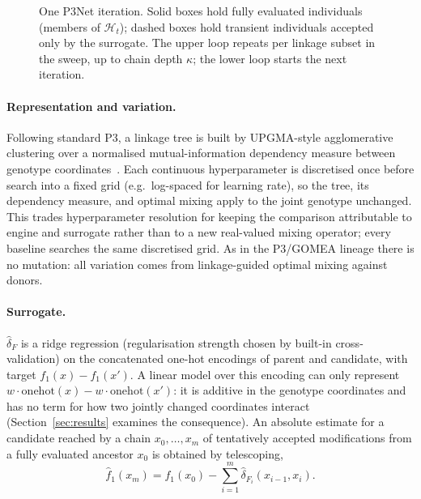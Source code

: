 \begin{figure}[t]
{%
    }
    \caption{One P3Net iteration. Solid boxes hold fully evaluated individuals (members of $\mathcal{H}_t$);
    dashed boxes hold transient individuals accepted only by the surrogate. The upper loop repeats per linkage
    subset in the sweep, up to chain depth $\kappa$; the lower loop starts the next iteration.}
    \label{fig:p3net-loop}
\end{figure}

\paragraph{Representation and variation.} Following standard P3, a linkage tree is built by UPGMA-style
agglomerative clustering over a normalised mutual-information dependency measure between genotype
coordinates~\citep{goldman2014parameterless}. Each continuous hyperparameter is discretised once before search
into a fixed grid (e.g.\ log-spaced for learning rate), so the tree, its dependency measure, and optimal mixing
apply to the joint genotype unchanged. This trades hyperparameter resolution for keeping the comparison
attributable to engine and surrogate rather than to a new real-valued mixing operator; every baseline searches
the same discretised grid. As in the P3/GOMEA lineage there is no mutation: all variation comes from
linkage-guided optimal mixing against donors.

\paragraph{Surrogate.} $\hat\delta_F$ is a ridge regression (regularisation strength chosen by built-in
cross-validation) on the concatenated one-hot encodings of parent and candidate, with target
$f_1(x) - f_1(x')$. A linear model over this encoding can only represent
$w \cdot \mathrm{onehot}(x) - w \cdot \mathrm{onehot}(x')$: it is additive in the genotype coordinates and has
no term for how two jointly changed coordinates interact (Section~\ref{sec:results} examines the consequence).
An absolute estimate for a candidate reached by a chain $x_0, \dots, x_m$ of tentatively accepted modifications
from a fully evaluated ancestor $x_0$ is obtained by telescoping,
\[
    \hat{f}_1(x_m) = f_1(x_0) - \textstyle\sum_{i=1}^{m} \hat{\delta}_{F_i}(x_{i-1}, x_i).
\]

